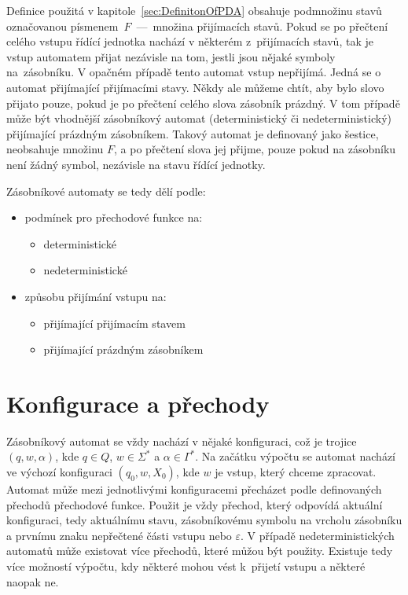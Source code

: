 Definice použitá v kapitole~\ref{sec:DefinitonOfPDA} obsahuje podmnožinu stavů označovanou písmenem~$F$~---~množina přijímacích stavů. Pokud se po přečtení celého vstupu řídící jednotka nachází v některém z~přijímacích stavů, tak je vstup automatem přijat nezávisle na tom, jestli jsou nějaké symboly na~zásobníku. V opačném případě tento automat vstup nepřijímá. Jedná se o automat přijímající přijímacími stavy. Někdy ale můžeme chtít, aby bylo slovo přijato pouze, pokud je po přečtení celého slova zásobník prázdný. V tom případě může být vhodnější zásobníkový automat (deterministický či nedeterministický) přijímající prázdným zásobníkem. Takový automat je definovaný jako šestice, neobsahuje množinu $F$, a po přečtení slova jej přijme, pouze pokud na zásobníku není žádný symbol, nezávisle na stavu řídící jednotky.

Zásobníkové automaty se tedy dělí podle:
\begin{itemize}
    \item podmínek pro přechodové funkce na:
        \begin{itemize}
            \item deterministické
            \item nedeterministické
        \end{itemize}
    \item způsobu přijímání vstupu na:
        \begin{itemize}
            \item přijímající přijímacím stavem
            \item přijímající prázdným zásobníkem
        \end{itemize}
\end{itemize}

\section{Konfigurace a přechody}

Zásobníkový automat se vždy nachází v nějaké konfiguraci, což je trojice $(q,w,\alpha)$, kde $q \in Q$, $w \in \Sigma^{*}$ a $\alpha \in \Gamma^{*}$. Na začátku výpočtu se automat nachází ve výchozí konfiguraci $(q_0, w, X_0)$, kde $w$ je vstup, který chceme zpracovat.~\cite{Kozen1997} Automat může mezi jednotlivými konfiguracemi přecházet podle definovaných přechodů přechodové funkce. Použit je vždy přechod, který odpovídá aktuální konfiguraci, tedy aktuálnímu stavu, zásobníkovému symbolu na vrcholu zásobníku a prvnímu znaku nepřečtené části vstupu nebo $\varepsilon$. V případě nedeterministických automatů může existovat více přechodů, které můžou být použity. Existuje tedy více možností výpočtu, kdy některé mohou vést k~přijetí vstupu a některé naopak ne.

